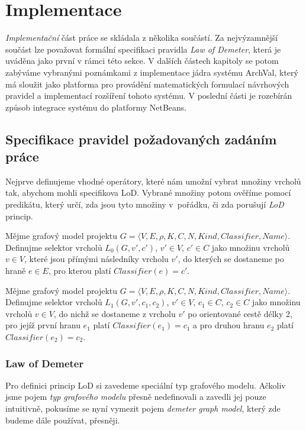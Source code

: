 \chapter{Implementace}

\emph{Implementační} část práce se skládala z několika součástí. Za nejvýzamnější součást lze považovat formální specifikaci pravidla \emph{Law of Demeter}, která je uváděna jako první v rámci této sekce. V dalších částech kapitoly se potom zabýváme vybranými poznámkami z implementace jádra systému ArchVal, který má sloužit jako platforma pro provádění matematických formulací návrhových pravidel a implementací rozšíření tohoto systému. V poslední části je rozebírán způsob integrace systému do platformy NetBeans.

\section{Specifikace pravidel požadovaných zadáním práce}
Nejprve definujeme vhodné operátory, které nám umožní vybrat množiny vrcholů tak, abychom mohli specifikova LoD. Vybrané množiny potom ověříme pomocí predikátu, který určí, zda jsou tyto množiny v~pořádku, či zda porušují \emph{LoD} princip.

\begin{definition}
Mějme grafový model projektu $G = \langle V, E, \rho, K, C, N, \mathit{Kind}, \mathit{Classifier}, \mathit{Name}\rangle$. Definujme selektor vrcholů $L_0(G, v', c')$, $v' \in V$, $c' \in C$ jako množinu vrcholů $v \in V$, které jsou přímými následníky vrcholu $v'$, do kterých se dostaneme po hraně $e \in E$, pro kterou platí $Classifier(e) = c' $.
\end{definition}

\begin{definition}
Mějme grafový model projektu $G = \langle V, E, \rho, K, C, N, \mathit{Kind}, \mathit{Classifier}, \mathit{Name}\rangle$. Definujme selektor vrcholů $L_1(G, v', c_1, c_2)$, $v' \in V$, $c_1 \in C$, $c_2 \in C$ jako množinu vrcholů $v \in V$, do nichž se dostaneme z vrcholu $v'$ po orientované cestě délky 2, pro jejíž první hranu $e_1$ platí $Classifier(e_1) = c_1$ a pro druhou hranu $e_2$ platí $Classifier(e_2) = c_2$.
\end{definition}

\subsection{Law of Demeter}
\label{implementation-lod_specification}
Pro definici princip LoD si zavedeme speciální typ grafového modelu. Ačkoliv jsme pojem \emph{typ grafového modelu}  přesně nedefinovali a zavedli jej pouze intuitivně, pokusíme se nyní vymezit pojem \emph{demeter graph model}, který zde budeme dále používat, přesněji.

